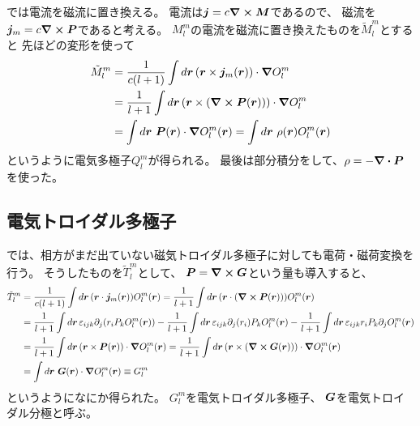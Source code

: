 \documentclass[../../master.tex]{subfiles}
\begin{document}
では電流を磁流に置き換える。
電流は\(\vb*{j}=c\curl \vb*{M}\)であるので、
磁流を\(\vb*{j}_m=c\curl \vb*{P}\)であると考える。
\(M_l^m\)の電流を磁流に置き換えたものを\(\tilde{M}_l^m\)とすると
先ほどの変形を使って
\begin{equation}\begin{aligned}[b]
    \tilde{M}_l^m
    &= \frac{1}{c(l+1)}\int d\vb*{r}\, (\vb*{r}\times \vb*{j}_m(\vb*{r}))\cdot\grad O_l^m\\
    &= \frac{1}{l+1}\int d\vb*{r}\, (\vb*{r}\times (\curl \vb*{P}(\vb*{r}))) \cdot\grad O_l^m\\
    &= \int d\vb*{r}\, \,\vb*{P}(\vb*{r}) \cdot \grad O_l^m(\vb*{r})
    = \int d\vb*{r}\, \,\rho(\vb*{r}) O_l^m(\vb*{r})
\end{aligned}\end{equation}
というように電気多極子\(Q_l^m\)が得られる。
最後は部分積分をして、\(\rho = -\div \vb*{P}\)を使った。

\subsection{電気トロイダル多極子}
では、相方がまだ出ていない磁気トロイダル多極子に対しても電荷・磁荷変換を行う。
そうしたものを\(\tilde{T}_l^m\)として、
\(\vb*{P} =\curl \vb*{G}\)という量も導入すると、
\begin{equation}\begin{aligned}[b]
    \tilde{T}_l^m
    &= \frac{1}{c(l+1)} \int d\vb*{r}\, (\vb*{r}\cdot \vb*{j}_m(\vb*{r}))O_l^m(\vb*{r})
    = \frac{1}{l+1} \int d\vb*{r}\, (\vb*{r}\cdot (\curl \vb*{P}(\vb*{r})))O_l^m(\vb*{r})\\
    &= \frac{1}{l+1} \int d\vb*{r}\, \varepsilon_{ijk} \partial_j(r_i P_k O_l^m(\vb*{r}))
    - \frac{1}{l+1} \int d\vb*{r}\, \varepsilon_{ijk} \partial_j(r_i) P_k O_l^m(\vb*{r})
    - \frac{1}{l+1} \int d\vb*{r}\, \varepsilon_{ijk} r_i P_k \partial_jO_l^m(\vb*{r})\\
    &= \frac{1}{l+1} \int d\vb*{r}\, (\vb*{r}\times \vb*{P}(\vb*{r})) \cdot \grad O_l^m(\vb*{r})
    = \frac{1}{l+1} \int d\vb*{r}\, (\vb*{r}\times (\curl \vb*{G}(\vb*{r}))) \cdot \grad O_l^m(\vb*{r})\\
    &= \int d\vb*{r}\, \,\vb*{G}(\vb*{r}) \cdot \grad O_l^m(\vb*{r})
    \equiv G_l^m
\end{aligned}\end{equation}
というようになにか得られた。
\(G_l^m\)を電気トロイダル多極子、
\(\vb*{G}\)を電気トロイダル分極と呼ぶ。
\end{document}
